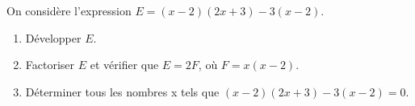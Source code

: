 
On considère l'expression $E = (x - 2)(2x + 3) - 3(x - 2)$.

\medskip

\begin{enumerate}
\item Développer $E$.
\item Factoriser $E$ et vérifier que $E = 2F$, où $F = x(x - 2)$.
\item Déterminer tous les nombres x tels que $(x - 2)(2x + 3) - 3(x - 2) = 0$.
\end{enumerate}